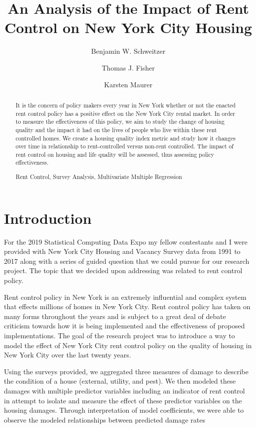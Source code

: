 \documentclass[11pt]{asaproc}\usepackage[]{graphicx}\usepackage[]{color}
\title{An Analysis of the Impact of Rent Control on New York City Housing}
\author{Benjamin W. Schweitzer \and Thomas J. Fisher \and Karsten Maurer}
\begin{document}
\maketitle

\begin{abstract}
It is the concern of policy makers every year in New York whether or not the enacted rent control policy has a positive effect on the New York City rental market. In order to measure the effectiveness of this policy, we aim to study the change of housing quality and the impact it had on the lives of people who live within these rent controlled homes. We create a housing quality index metric and study how it changes over time in relationship to rent-controlled versus non-rent controlled. The impact of rent control on housing and life quality will be assessed, thus assessing policy effectiveness.
\begin{keywords}
Rent Control, Survey Analysis, Multivariate Multiple Regression
\end{keywords}
\end{abstract}

\section{Introduction\label{intro}}

For the 2019 Statistical Computing Data Expo my fellow contestants and I were provided with New York City Housing and Vacancy Survey data from 1991 to 2017 along with a series of guided question that we could pursue for our research project. The topic that we decided upon addressing was related to rent control policy.

Rent control policy in New York is an extremely influential and complex system that effects millions of homes in New York City. Rent control policy has taken on many forms throughout the years and is subject to a great deal of debate criticism towards how it is being implemented and the effectiveness of proposed implementations. The goal of the research project was to introduce a way to model the effect of New York City rent control policy on the quality of housing in New York City over the last twenty years.

Using the surveys provided, we aggregated three measures of damage to describe the condition of a house (external, utility, and pest). We then modeled these damages with multiple predictor variables including an indicator of rent control in attempt to isolate and measure the effect of these predictor variables on the housing damages. Through interpretation of model coefficients, we were able to observe the modeled relationships between predicted damage rates 
\end{document}

